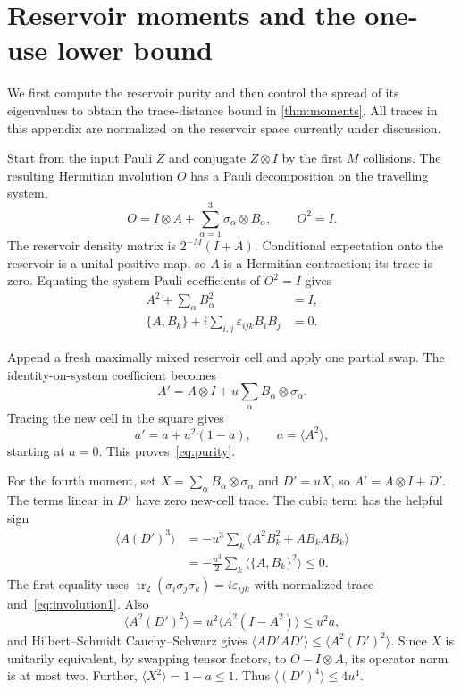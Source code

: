 \section{Reservoir moments and the one-use lower bound}\label{app:moments}

We first compute the reservoir purity and then control the spread of its eigenvalues to obtain the trace-distance bound in \cref{thm:moments}. All traces in this appendix are normalized on the reservoir space currently under discussion.

Start from the input Pauli $Z$ and conjugate $Z\otimes I$ by the first $M$ collisions. The resulting Hermitian involution $O$ has a Pauli decomposition on the travelling system,
\begin{equation}
 O=I\otimes A+\sum_{\alpha=1}^3\sigma_\alpha\otimes B_\alpha,
 \qquad O^2=I.
 \label{eq:odecomp}
\end{equation}
The reservoir density matrix is $2^{-M}(I+A)$. Conditional expectation onto the reservoir is a unital positive map, so $A$ is a Hermitian contraction; its trace is zero. Equating the system-Pauli coefficients of $O^2=I$ gives
\begin{align}
 A^2+\sum_\alpha B_\alpha^2&=I,\label{eq:involution0}\\
 \{A,B_k\}+i\sum_{i,j}\varepsilon_{ijk}B_iB_j&=0.\label{eq:involution1}
\end{align}

Append a fresh maximally mixed reservoir cell and apply one partial swap. The identity-on-system coefficient becomes
\begin{equation}
 A'=A\otimes I+u\sum_\alpha B_\alpha\otimes\sigma_\alpha.
 \label{eq:recursionA}
\end{equation}
Tracing the new cell in the square gives
\begin{equation}
 a'=a+u^2(1-a),\qquad a=\langle A^2\rangle,
\end{equation}
starting at $a=0$. This proves~\eqref{eq:purity}.

For the fourth moment, set $X=\sum_\alpha B_\alpha\otimes\sigma_\alpha$ and $D'=uX$, so $A'=A\otimes I+D'$. The terms linear in $D'$ have zero new-cell trace. The cubic term has the helpful sign
\begin{align}
 \langle A(D')^3\rangle
 &=-u^3\sum_k\langle A^2B_k^2+AB_kAB_k\rangle\nonumber\\
 &=-\frac{u^3}{2}\sum_k\langle\{A,B_k\}^2\rangle\le0.
 \label{eq:cubicsign}
\end{align}
The first equality uses $\operatorname{tr}_2(\sigma_i\sigma_j\sigma_k)=i\varepsilon_{ijk}$ with normalized trace and~\eqref{eq:involution1}. Also
\begin{equation}
 \langle A^2(D')^2\rangle=u^2\langle A^2(I-A^2)\rangle\le u^2a,
\end{equation}
and Hilbert--Schmidt Cauchy--Schwarz gives
$\langle AD'AD'\rangle\le\langle A^2(D')^2\rangle$.
Since $X$ is unitarily equivalent, by swapping tensor factors, to $O-I\otimes A$, its operator norm is at most two. Further, $\langle X^2\rangle=1-a\le1$. Thus $\langle(D')^4\rangle\le4u^4$.

